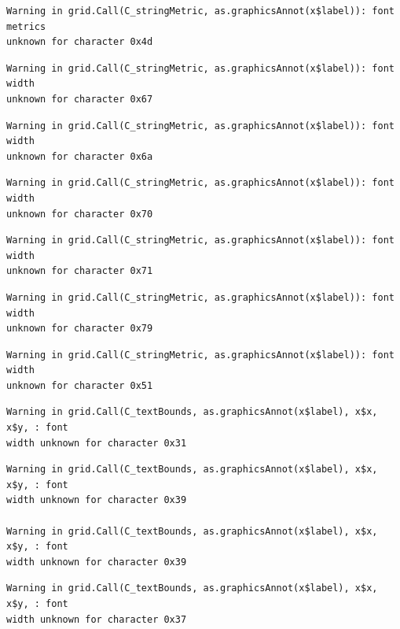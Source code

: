 \documentclass[
  letterpaper,
  DIV=11,
  numbers=noendperiod]{scrreprt}
\begin{document}
\begin{verbatim}
Warning in grid.Call(C_stringMetric, as.graphicsAnnot(x$label)): font metrics
unknown for character 0x4d
\end{verbatim}

\begin{verbatim}
Warning in grid.Call(C_stringMetric, as.graphicsAnnot(x$label)): font width
unknown for character 0x67
\end{verbatim}

\begin{verbatim}
Warning in grid.Call(C_stringMetric, as.graphicsAnnot(x$label)): font width
unknown for character 0x6a
\end{verbatim}

\begin{verbatim}
Warning in grid.Call(C_stringMetric, as.graphicsAnnot(x$label)): font width
unknown for character 0x70
\end{verbatim}

\begin{verbatim}
Warning in grid.Call(C_stringMetric, as.graphicsAnnot(x$label)): font width
unknown for character 0x71
\end{verbatim}

\begin{verbatim}
Warning in grid.Call(C_stringMetric, as.graphicsAnnot(x$label)): font width
unknown for character 0x79
\end{verbatim}

\begin{verbatim}
Warning in grid.Call(C_stringMetric, as.graphicsAnnot(x$label)): font width
unknown for character 0x51
\end{verbatim}

\begin{verbatim}
Warning in grid.Call(C_textBounds, as.graphicsAnnot(x$label), x$x, x$y, : font
width unknown for character 0x31
\end{verbatim}

\begin{verbatim}
Warning in grid.Call(C_textBounds, as.graphicsAnnot(x$label), x$x, x$y, : font
width unknown for character 0x39

Warning in grid.Call(C_textBounds, as.graphicsAnnot(x$label), x$x, x$y, : font
width unknown for character 0x39
\end{verbatim}

\begin{verbatim}
Warning in grid.Call(C_textBounds, as.graphicsAnnot(x$label), x$x, x$y, : font
width unknown for character 0x37
\end{verbatim}
\end{document}

